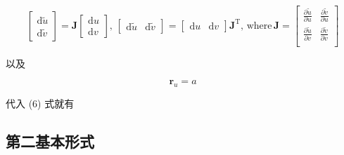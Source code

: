 \documentclass[a4paper, 12pt]{article}
\begin{document}
    \[
    \begin{bmatrix}
    \mathrm d\tilde u \\ 
    \mathrm d\tilde v
    \end{bmatrix}
    =\boldsymbol J
    \begin{bmatrix}
    \mathrm du\\
    \mathrm dv
    \end{bmatrix}
    ,\,
    \begin{bmatrix}
    \mathrm d\tilde u & \mathrm d\tilde v
    \end{bmatrix}
    =
    \begin{bmatrix}
    \mathrm du & \mathrm dv
    \end{bmatrix}
    \boldsymbol J^{\mathrm T}
    ,\,\text{where}\,\boldsymbol J=
    \begin{bmatrix}
    \frac{\partial \tilde u}{\partial u} & \frac{\partial \tilde v}{\partial u} \\
    \frac{\partial \tilde u}{\partial v} & \frac{\partial \tilde v}{\partial v} \\
    \end{bmatrix}
    \]

    以及

    \[
    \boldsymbol r_u=a
    \]

    代入 (6) 式就有

    \subsection{第二基本形式}
\end{document}

